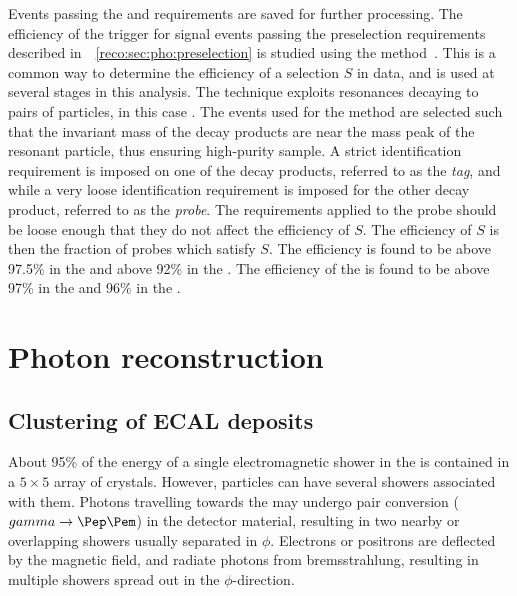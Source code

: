 Events passing the \LI and \HLT requirements are saved for further processing. The efficiency of the trigger for signal events passing the preselection requirements described in~\Sec~\ref{reco:sec:pho:preselection} is studied using the \TagAndProbe method~\cite{TagAndProbe}. This is a common way to determine the efficiency of a selection $S$ in data, and is used at several stages in this analysis. The technique exploits resonances decaying to pairs of particles, in this case \Zee. The events used for the \TagAndProbe method are selected such that the invariant mass of the decay products are near the mass peak of the resonant particle, thus ensuring high-purity sample. A strict identification requirement is imposed on one of the decay products, referred to as the \emph{tag}, and while a very loose identification requirement is imposed for the other decay product, referred to as the \emph{probe}. The requirements applied to the probe should be loose enough that they do not affect the efficiency of $S$. The efficiency of $S$ is then the fraction of probes which satisfy $S$. 
The \LI efficiency is found to be above 97.5\% in the \EB and above 92\% in the \EE. The efficiency of the \HLT is found to be above 97\% in the \EB and 96\% in the \EE. %


\section{Photon reconstruction} 
\label{reco:sec:photons}



\subsection{Clustering of ECAL deposits}

About 95\% of the energy of a single electromagnetic shower in the \ECAL is contained in a $5\times5$ array of crystals. However, particles can have several showers associated with them. Photons travelling towards the \ECAL may undergo pair conversion ($\gamma \rightarrow \Pep \Pem$) in the detector material, resulting in two nearby or overlapping showers usually separated in $\phi$. Electrons or positrons are deflected by the magnetic field, and radiate photons from bremsstrahlung, resulting in multiple showers spread out in the $\phi$-direction. 

